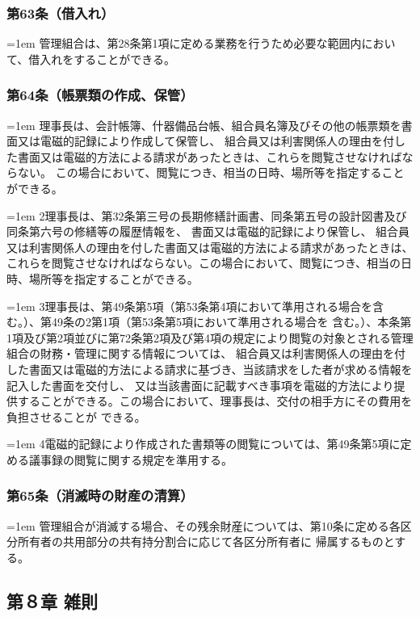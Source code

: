 \documentclass[
  luatex,
  paper=a4paper,
  fontsize=11pt,
  jafontsize=11pt,
  jlreq_notes,
]{jlreq}
\newcommand{\joumain}[1]{%
  \noindent\hangindent=1em\hangafter=1
  \hspace{1em}#1%
}
\newcommand{\kou}[2]{%
  \par\noindent\hangindent=1em\hangafter=1
  #1\hspace{1em}#2%
}
\begin{document}
  \subsubsection*{第63条（借入れ）}
  \joumain{管理組合は、第28条第1項に定める業務を行うため必要な範囲内において、借入れをすることができる。}

  \subsubsection*{第64条（帳票類の作成、保管）}
  \joumain{理事長は、会計帳簿、什器備品台帳、組合員名簿及びその他の帳票類を書面又は電磁的記録により作成して保管し、
  組合員又は利害関係人の理由を付した書面又は電磁的方法による請求があったときは、これらを閲覧させなければならない。
  この場合において、閲覧につき、相当の日時、場所等を指定することができる。}
  \kou{2}{理事長は、第32条第三号の長期修繕計画書、同条第五号の設計図書及び同条第六号の修繕等の履歴情報を、
  書面又は電磁的記録により保管し、 組合員又は利害関係人の理由を付した書面又は電磁的方法による請求があったときは、
  これらを閲覧させなければならない。この場合において、閲覧につき、相当の日時、場所等を指定することができる。}
  \kou{3}{理事長は、第49条第5項（第53条第4項において準用される場合を含む。）、第49条の2第1項（第53条第5項において準用される場合を
  含む。）、本条第1項及び第2項並びに第72条第2項及び第4項の規定により閲覧の対象とされる管理組合の財務・管理に関する情報については、
  組合員又は利害関係人の理由を付した書面又は電磁的方法による請求に基づき、当該請求をした者が求める情報を記入した書面を交付し、
  又は当該書面に記載すべき事項を電磁的方法により提供することができる。この場合において、理事長は、交付の相手方にその費用を負担させることが
  できる。}
  \kou{4}{電磁的記録により作成された書類等の閲覧については、第49条第5項に定める議事録の閲覧に関する規定を準用する。}

  \subsubsection*{第65条（消滅時の財産の清算）}
  \joumain{管理組合が消滅する場合、その残余財産については、第10条に定める各区分所有者の共用部分の共有持分割合に応じて各区分所有者に
  帰属するものとする。}
  
  \begin{center}
  \subsection*{第８章 雑則}
  \end{center}
\end{document}
